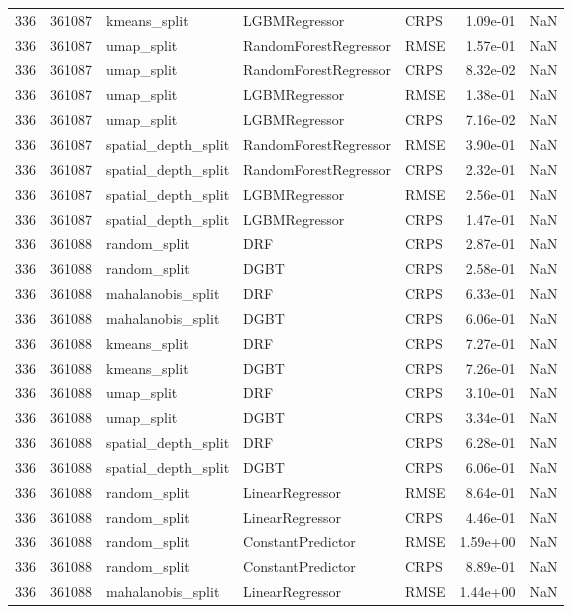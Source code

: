\begin{tabular}{rrlllrr}
336 & 361087 & kmeans\_split & LGBMRegressor & CRPS & 1.09e-01 & NaN \\
336 & 361087 & umap\_split & RandomForestRegressor & RMSE & 1.57e-01 & NaN \\
336 & 361087 & umap\_split & RandomForestRegressor & CRPS & 8.32e-02 & NaN \\
336 & 361087 & umap\_split & LGBMRegressor & RMSE & 1.38e-01 & NaN \\
336 & 361087 & umap\_split & LGBMRegressor & CRPS & 7.16e-02 & NaN \\
336 & 361087 & spatial\_depth\_split & RandomForestRegressor & RMSE & 3.90e-01 & NaN \\
336 & 361087 & spatial\_depth\_split & RandomForestRegressor & CRPS & 2.32e-01 & NaN \\
336 & 361087 & spatial\_depth\_split & LGBMRegressor & RMSE & 2.56e-01 & NaN \\
336 & 361087 & spatial\_depth\_split & LGBMRegressor & CRPS & 1.47e-01 & NaN \\
336 & 361088 & random\_split & DRF & CRPS & 2.87e-01 & NaN \\
336 & 361088 & random\_split & DGBT & CRPS & 2.58e-01 & NaN \\
336 & 361088 & mahalanobis\_split & DRF & CRPS & 6.33e-01 & NaN \\
336 & 361088 & mahalanobis\_split & DGBT & CRPS & 6.06e-01 & NaN \\
336 & 361088 & kmeans\_split & DRF & CRPS & 7.27e-01 & NaN \\
336 & 361088 & kmeans\_split & DGBT & CRPS & 7.26e-01 & NaN \\
336 & 361088 & umap\_split & DRF & CRPS & 3.10e-01 & NaN \\
336 & 361088 & umap\_split & DGBT & CRPS & 3.34e-01 & NaN \\
336 & 361088 & spatial\_depth\_split & DRF & CRPS & 6.28e-01 & NaN \\
336 & 361088 & spatial\_depth\_split & DGBT & CRPS & 6.06e-01 & NaN \\
336 & 361088 & random\_split & LinearRegressor & RMSE & 8.64e-01 & NaN \\
336 & 361088 & random\_split & LinearRegressor & CRPS & 4.46e-01 & NaN \\
336 & 361088 & random\_split & ConstantPredictor & RMSE & 1.59e+00 & NaN \\
336 & 361088 & random\_split & ConstantPredictor & CRPS & 8.89e-01 & NaN \\
336 & 361088 & mahalanobis\_split & LinearRegressor & RMSE & 1.44e+00 & NaN \\

\end{tabular}
